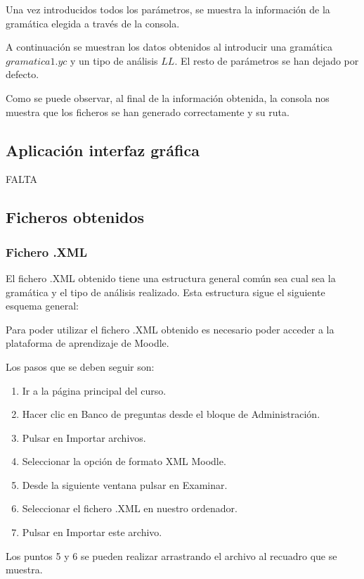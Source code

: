 Una vez introducidos todos los parámetros, se muestra la información de la gramática elegida a través de la consola.

A continuación se muestran los datos obtenidos al introducir una gramática $gramatica1.yc$ y un tipo de análisis $LL$. El resto de parámetros se han dejado por defecto.


Como se puede observar, al final de la información obtenida, la consola nos muestra que los ficheros se han generado correctamente y su ruta.


\subsection{Aplicación interfaz gráfica}
FALTA


\subsection{Ficheros obtenidos}
\subsubsection{Fichero .XML}

El fichero .XML obtenido tiene una estructura general común sea cual sea la gramática y el tipo de análisis realizado. Esta estructura sigue el siguiente esquema general:

Para poder utilizar el fichero .XML obtenido es necesario poder acceder a la plataforma de aprendizaje de Moodle.

Los pasos que se deben seguir son:
\begin{enumerate}
\item Ir a la página principal del curso.
\item Hacer clic en Banco de preguntas desde el bloque de Administración.
\item Pulsar en Importar archivos.
\item Seleccionar la opción de formato XML Moodle.
\item Desde la siguiente ventana pulsar en Examinar.
\item Seleccionar el fichero .XML en nuestro ordenador.
\item Pulsar en Importar este archivo.
\end{enumerate}

Los puntos 5 y 6 se pueden realizar arrastrando el archivo al recuadro que se muestra.

